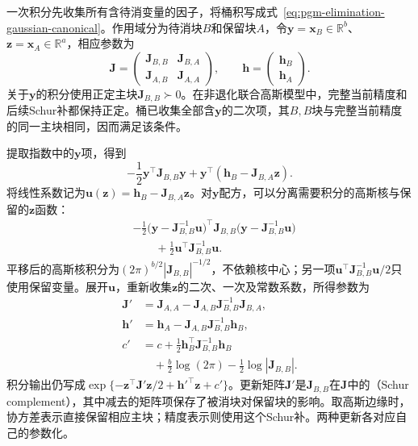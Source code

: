 一次积分先收集所有含待消变量的因子，将桶积写成式~\eqref{eq:pgm-elimination-gaussian-canonical}。作用域分为待消块$B$和保留块$A$，令$\bm{y}=\bm{x}_B\in\mathbb{R}^{b}$、$\bm{z}=\bm{x}_A\in\mathbb{R}^{a}$，相应参数为
\[
  \bm{J}=
  \begin{pmatrix}
    \bm{J}_{B,B}&\bm{J}_{B,A}\\
    \bm{J}_{A,B}&\bm{J}_{A,A}
  \end{pmatrix},
  \qquad
  \bm{h}=
  \begin{pmatrix}\bm{h}_B\\\bm{h}_A\end{pmatrix}.
\]
关于$\bm{y}$的积分使用正定主块$\bm{J}_{B,B}\succ0$。在非退化联合高斯模型中，完整当前精度和后续Schur补都保持正定。桶已收集全部含$\bm{y}$的二次项，其$B,B$块与完整当前精度的同一主块相同，因而满足该条件。

提取指数中的$\bm{y}$项，得到
\[
  -\frac12\bm{y}^{\top}\bm{J}_{B,B}\bm{y}
  +\bm{y}^{\top}(\bm{h}_B-\bm{J}_{B,A}\bm{z}).
\]
将线性系数记为$\bm{u}(\bm{z})=\bm{h}_B-\bm{J}_{B,A}\bm{z}$。对$\bm{y}$配方，可以分离需要积分的高斯核与保留的$\bm{z}$函数：
\begin{equation}
  \begin{aligned}
    &-\frac12
      \bigl(\bm{y}-\bm{J}_{B,B}^{-1}\bm{u}\bigr)^{\top}
      \bm{J}_{B,B}
      \bigl(\bm{y}-\bm{J}_{B,B}^{-1}\bm{u}\bigr)\\
    &\hspace{2em}
      +\frac12\bm{u}^{\top}\bm{J}_{B,B}^{-1}\bm{u}.
  \end{aligned}
  \label{eq:pgm-elimination-complete-square}
\end{equation}
平移后的高斯核积分为$(2\pi)^{b/2}|\bm{J}_{B,B}|^{-1/2}$，不依赖核中心；另一项$\bm{u}^{\top}\bm{J}_{B,B}^{-1}\bm{u}/2$只使用保留变量。展开$\bm{u}$，重新收集$\bm{z}$的二次、一次及常数系数，所得参数为
\begin{equation}
  \begin{aligned}
    \bm{J}'&=\bm{J}_{A,A}
      -\bm{J}_{A,B}\bm{J}_{B,B}^{-1}\bm{J}_{B,A},\\
    \bm{h}'&=\bm{h}_A
      -\bm{J}_{A,B}\bm{J}_{B,B}^{-1}\bm{h}_B,\\
    c'&=c+\frac12\bm{h}_B^{\top}\bm{J}_{B,B}^{-1}\bm{h}_B\\
      &\quad+\frac b2\log(2\pi)-\frac12\log|\bm{J}_{B,B}|.
  \end{aligned}
  \label{eq:pgm-elimination-schur}
\end{equation}
积分输出仍写成$\exp\{-\bm{z}^{\top}\bm{J}'\bm{z}/2+\bm{h}'^{\top}\bm{z}+c'\}$。更新矩阵$\bm{J}'$是$\bm{J}_{B,B}$在$\bm{J}$中的（Schur complement），其中减去的矩阵项保存了被消块对保留块的影响。取高斯边缘时，协方差表示直接保留相应主块；精度表示则使用这个Schur补。两种更新各对应自己的参数化。

